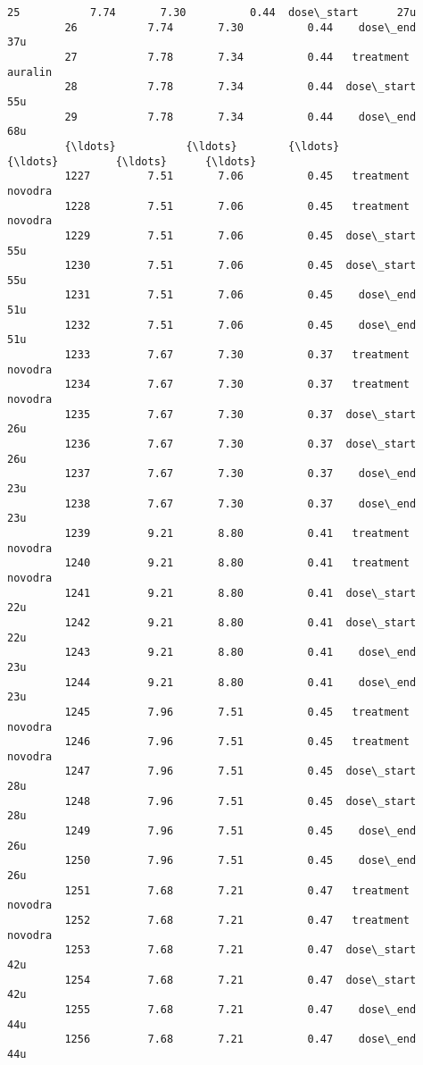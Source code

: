 \documentclass[11pt]{article}
\begin{document}
\begin{Verbatim}[commandchars=\\\{\}]
         25           7.74       7.30          0.44  dose\_start      27u   
         26           7.74       7.30          0.44    dose\_end      37u   
         27           7.78       7.34          0.44   treatment  auralin   
         28           7.78       7.34          0.44  dose\_start      55u   
         29           7.78       7.34          0.44    dose\_end      68u   
         {\ldots}           {\ldots}        {\ldots}           {\ldots}         {\ldots}      {\ldots}   
         1227         7.51       7.06          0.45   treatment  novodra   
         1228         7.51       7.06          0.45   treatment  novodra   
         1229         7.51       7.06          0.45  dose\_start      55u   
         1230         7.51       7.06          0.45  dose\_start      55u   
         1231         7.51       7.06          0.45    dose\_end      51u   
         1232         7.51       7.06          0.45    dose\_end      51u   
         1233         7.67       7.30          0.37   treatment  novodra   
         1234         7.67       7.30          0.37   treatment  novodra   
         1235         7.67       7.30          0.37  dose\_start      26u   
         1236         7.67       7.30          0.37  dose\_start      26u   
         1237         7.67       7.30          0.37    dose\_end      23u   
         1238         7.67       7.30          0.37    dose\_end      23u   
         1239         9.21       8.80          0.41   treatment  novodra   
         1240         9.21       8.80          0.41   treatment  novodra   
         1241         9.21       8.80          0.41  dose\_start      22u   
         1242         9.21       8.80          0.41  dose\_start      22u   
         1243         9.21       8.80          0.41    dose\_end      23u   
         1244         9.21       8.80          0.41    dose\_end      23u   
         1245         7.96       7.51          0.45   treatment  novodra   
         1246         7.96       7.51          0.45   treatment  novodra   
         1247         7.96       7.51          0.45  dose\_start      28u   
         1248         7.96       7.51          0.45  dose\_start      28u   
         1249         7.96       7.51          0.45    dose\_end      26u   
         1250         7.96       7.51          0.45    dose\_end      26u   
         1251         7.68       7.21          0.47   treatment  novodra   
         1252         7.68       7.21          0.47   treatment  novodra   
         1253         7.68       7.21          0.47  dose\_start      42u   
         1254         7.68       7.21          0.47  dose\_start      42u   
         1255         7.68       7.21          0.47    dose\_end      44u   
         1256         7.68       7.21          0.47    dose\_end      44u   
         

\end{Verbatim}
\end{document}
